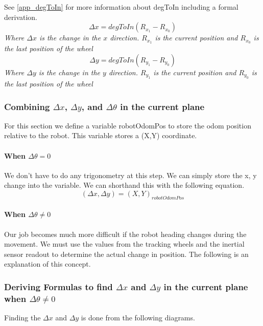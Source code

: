 \documentclass[12pt]{report}
\begin{document}
See \ref{app_degToIn} for more information about degToIn including a formal derivation.
$$
    \Delta x = degToIn(R_{x_1} - R_{x_0})
$$
\textit{Where $\Delta x$ is the change in the $x$ direction. $R_{x_1}$ is the current position and $R_{x_0}$ is the last position of the wheel}
$$
    \Delta y = degToIn(R_{y_1} - R_{y_0})
$$
\textit{Where $\Delta y$ is the change in the $y$ direction. $R_{y_1}$ is the current position and $R_{y_0}$ is the last position of the wheel}

\subsubsection{Combining $\Delta x$, $\Delta y$, and $\Delta\theta$ in the current plane}
    For this section we define a variable robotOdomPos to store the odom position relative to the robot.
    This variable stores a (X,Y) coordinate.
\paragraph{When $\Delta\theta = 0$}
    We don't have to do any trigonometry at this step.
    We can simply store the x, y change into the variable.
    We can shorthand this with the following equation.
    $$ (\Delta x, \Delta y) = (X,Y)_{robotOdomPos} $$
\paragraph{When $\Delta\theta \neq 0$}\label{deltaneqtheta}
Our job becomes much more difficult if the robot heading changes during the movement.
We must use the values from the tracking wheels and the inertial sensor readout to determine the actual change in position.
The following is an explanation of this concept.

\subsubsection{Deriving Formulas to find $\Delta x$ and $\Delta y$ in the current plane when $\Delta\theta \neq 0$} \label{app_trighell}

Finding the $\Delta x$ and $\Delta y$ is done from the following diagrams.
\end{document}
